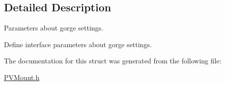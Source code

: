 \subsection{Detailed Description}
Parameters about gorge settings. 

Define interface parameters about gorge settings. 

The documentation for this struct was generated from the following file\+:\begin{DoxyCompactItemize}
\item 
\hyperlink{_p_v_mount_8h}{P\+V\+Mount.\+h}\end{DoxyCompactItemize}
